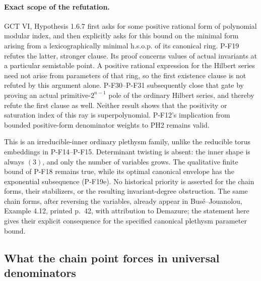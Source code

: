 \documentclass[11pt,a4paper]{article}
\begin{document}
\paragraph{Exact scope of the refutation.}
GCT VI, Hypothesis 1.6.7 first asks for some positive rational
form of polynomial modular index, and then explicitly asks for
this bound on the minimal form arising from a lexicographically
minimal h.s.o.p. of its canonical ring. P-F19 refutes the latter,
stronger clause. Its proof concerns values of actual invariants
at a particular semistable point. A positive rational expression
for the Hilbert series need not arise from parameters of that
ring, so the first existence clause is not refuted by this
argument alone. P-F30--P-F31 subsequently close that gate by proving
an actual primitive-$2^{n-1}$ pole of the ordinary Hilbert series,
and thereby refute the first clause as well. Neither result shows
that the positivity or saturation index of this ray is superpolynomial. P-F12's implication from
bounded positive-form denominator weights to PH2 remains valid.

This is an irreducible-inner ordinary plethysm family, unlike
the reducible torus embeddings in P-F14--P-F15. Determinant
twisting is absent: the inner shape is always $(3)$, and only
the number of variables grows. The qualitative finite bound
of P-F18 remains true, while its optimal canonical envelope
has the exponential subsequence (P-F19e). No historical
priority is asserted for the chain forms, their stabilizers,
or the resulting invariant-degree obstruction. The same chain
forms, after reversing the variables, already appear in
Bus\'e--Jouanolou, Example 4.12, printed p.~42, with attribution
to Demazure; the statement here gives their explicit consequence
for the specified canonical plethysm parameter bound.


\subsection{What the chain point forces in universal denominators}
\end{document}
